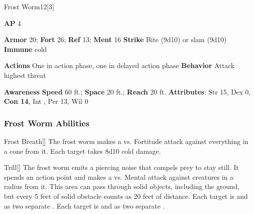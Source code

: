 \begin{monsection}{Frost Worm}{12}[3]
\vspace{-1em}\vspace{-1em}
\begin{spellcontent}
\begin{spelltargetinginfo}
{\textbf{AP} 4}

\pari \textbf{Armor} 20;
\textbf{Fort} 26;
\textbf{Ref} 13;
\textbf{Ment} 16
\pari \textbf{Strike} Bite  (9d10) or slam  (9d10)
\pari \textbf{Immune} cold

\pari \textbf{Actions} One in action phase, one in delayed action phase
\pari \textbf{Behavior} Attack highest threat
\end{spelltargetinginfo}
\end{spellcontent}

\begin{monsterfooter}
\pari \textbf{Awareness} 
\pari \textbf{Speed} 60 ft.;
\textbf{Space} 20 ft.;
\textbf{Reach} 20 ft.
\pari \textbf{Attributes}:
Str 15,
Dex 0,
\textbf{Con 14},
Int ,
Per 13,
Wil 0
\end{monsterfooter}
\end{monsection}


\subsubsection{Frost Worm Abilities}

\begin{ability}{Frost Breath}[]
The frost worm makes a  vs. Fortitude attack against everything in a \arealarge cone from it.
\hit Each target takes 8d10 cold damage.
\end{ability}

\vspace{0.5em}
\begin{ability}{Trill}[]
The frost worm emits a piercing noise that compels prey to stay still.
It spends an action point and makes a  vs. Mental attack against creatures in a \areahuge radius from it.
This area can pass through solid objects, including the ground, but every 5 feet of solid obstacle counts as 20 feet of distance.
\hit Each target is  and  as two separate .
\crit Each target is  and  as two separate .
\end{ability}

